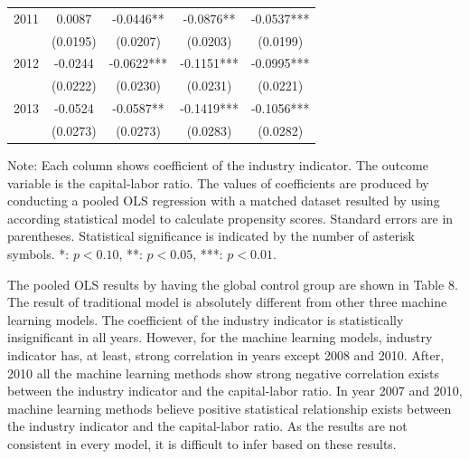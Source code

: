 \documentclass[11pt,a4paper,oneside]{article}
\begin{document}
\begin{table}[!t]
\begin{threeparttable}
\begin{tabular}{*9c}
		\multicolumn{1}{l}{2011} & \multicolumn{2}{c}{0.0087} & \multicolumn{2}{c}{-0.0446**} & \multicolumn{2}{c}{-0.0876**} & \multicolumn{2}{c}{-0.0537***}\\
		\multicolumn{1}{l}{} & \multicolumn{2}{c}{(0.0195)} & \multicolumn{2}{c}{(0.0207)} & \multicolumn{2}{c}{(0.0203)} & \multicolumn{2}{c}{(0.0199)}\\
		
		\multicolumn{1}{l}{2012} & \multicolumn{2}{c}{-0.0244} & \multicolumn{2}{c}{-0.0622***} & \multicolumn{2}{c}{-0.1151***} & \multicolumn{2}{c}{-0.0995***}\\
		\multicolumn{1}{l}{} & \multicolumn{2}{c}{(0.0222)} & \multicolumn{2}{c}{(0.0230)} & \multicolumn{2}{c}{(0.0231)}& \multicolumn{2}{c}{(0.0221)}\\
		
		\multicolumn{1}{l}{2013} & \multicolumn{2}{c}{-0.0524} & \multicolumn{2}{c}{-0.0587**} & \multicolumn{2}{c}{-0.1419***} & \multicolumn{2}{c}{-0.1056***}\\
		\multicolumn{1}{l}{} & \multicolumn{2}{c}{(0.0273)} & \multicolumn{2}{c}{(0.0273)} & \multicolumn{2}{c}{(0.0283)}& \multicolumn{2}{c}{(0.0282)}\\
		\bottomrule
	\end{tabular}
	\begin{tablenotes}
	    \linespread{1}\footnotesize
	     Note: Each column shows coefficient of the industry indicator. The outcome variable is the capital-labor ratio. The values of coefficients are produced by conducting a pooled OLS regression with a matched dataset resulted by using according statistical model to calculate propensity scores. Standard errors are in parentheses. Statistical significance is indicated by the number of asterisk symbols. *: $p<0.10$, **: $p<0.05$, ***: $p<0.01$.
	\end{tablenotes}
	\end{threeparttable}
	\label{table:8}
\end{table}

The pooled OLS results by having the global control group are shown in Table 8. The result of traditional model is absolutely different from other three machine learning models. The coefficient of the industry indicator is statistically insignificant in all years. However, for the machine learning models, industry indicator has, at least, strong correlation in years except 2008 and 2010. After, 2010 all the machine learning methods show strong negative correlation exists between the industry indicator and the capital-labor ratio. In year 2007 and 2010, machine learning methods believe positive statistical relationship exists between the industry indicator and the capital-labor ratio. As the results are not consistent in every model, it is difficult to infer based on these results.
\end{document}
